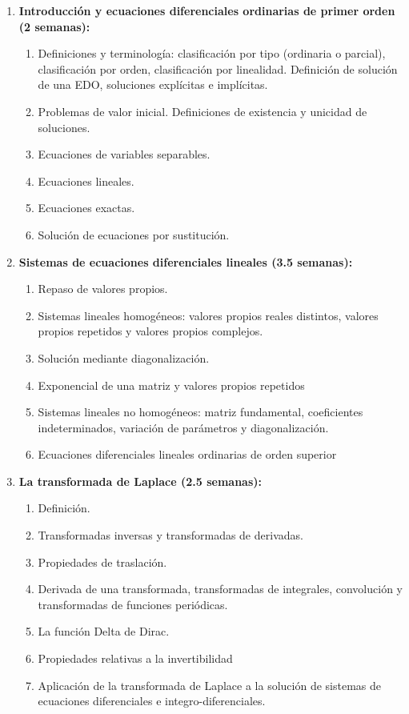 \begin{refsection}
\begin{enumerate}


\item \textbf{Introducción y ecuaciones diferenciales ordinarias de primer orden  (2 semanas):} 
\begin{enumerate}
    \item Definiciones y terminología: clasificación por tipo (ordinaria o parcial), clasificación por orden, clasificación por linealidad. Definición de solución de una EDO, soluciones explícitas e implícitas.
    \item Problemas de valor inicial. Definiciones de existencia y unicidad de soluciones.
    \item Ecuaciones de variables separables.
    \item Ecuaciones lineales.
    \item Ecuaciones exactas.
    \item Solución de ecuaciones por sustitución.
\end{enumerate}

\item \textbf{Sistemas de ecuaciones diferenciales lineales (3.5 semanas):} 
\begin{enumerate}
    \item Repaso de valores propios.
    \item Sistemas lineales homogéneos: valores propios reales distintos, valores propios repetidos y valores propios complejos.
    \item Solución mediante diagonalización.
    \item Exponencial de una matriz y valores propios repetidos
    \item Sistemas lineales no homogéneos: matriz fundamental, coeficientes indeterminados, variación de parámetros y diagonalización.
    \item Ecuaciones diferenciales lineales ordinarias de orden superior
\end{enumerate}
\item \textbf{La transformada de Laplace (2.5 semanas):}
\begin{enumerate}
    \item Definición.
    \item Transformadas inversas y transformadas de derivadas.
    \item Propiedades de traslación.
    \item Derivada de una transformada, transformadas de integrales, convolución y transformadas de funciones periódicas.
    \item La función Delta de Dirac.
    \item Propiedades relativas a la invertibilidad
    \item Aplicación de la transformada de Laplace a la solución de sistemas de ecuaciones diferenciales e integro-diferenciales. 
    

\end{enumerate}
\end{enumerate}
\end{refsection}
